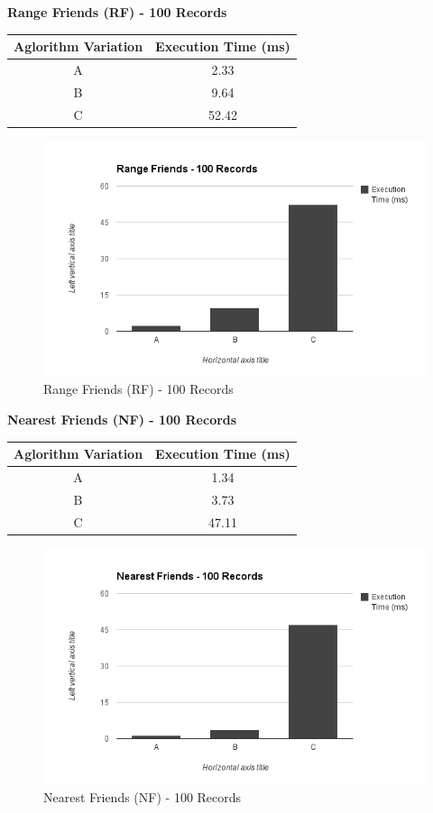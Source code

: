 \documentclass[prodmode,acmtods]{acmsmall} %
\begin{document}
\textbf{Range Friends (RF) - 100 Records}
\begin{tabular}{|c|c|}
\hline \rule[-2ex]{0pt}{5.5ex} Aglorithm Variation & Execution Time (ms) \\ 
\hline \rule[-2ex]{0pt}{5.5ex} A & 2.33 \\ 
\hline \rule[-2ex]{0pt}{5.5ex} B & 9.64 \\ 
\hline \rule[-2ex]{0pt}{5.5ex} C & 52.42 \\ 
\hline 
\end{tabular} 

\begin{figure}[h]
\centering
\includegraphics[width=0.7\linewidth]{./graphics/rf_100}
\caption{Range Friends (RF) - 100 Records}
\label{fig:nf_100}
\end{figure}

\clearpage{}
\textbf{Nearest Friends (NF) - 100 Records}
\begin{tabular}{|c|c|}
\hline \rule[-2ex]{0pt}{5.5ex} Aglorithm Variation & Execution Time (ms) \\ 
\hline \rule[-2ex]{0pt}{5.5ex} A & 1.34 \\ 
\hline \rule[-2ex]{0pt}{5.5ex} B & 3.73 \\ 
\hline \rule[-2ex]{0pt}{5.5ex} C & 47.11 \\ 
\hline 
\end{tabular} 

\begin{figure}[!h]
\centering
\includegraphics[width=0.7\linewidth]{./graphics/nf_100}
\caption{Nearest Friends (NF) - 100 Records}
\label{fig:nf_100}
\end{figure}
\end{document}
